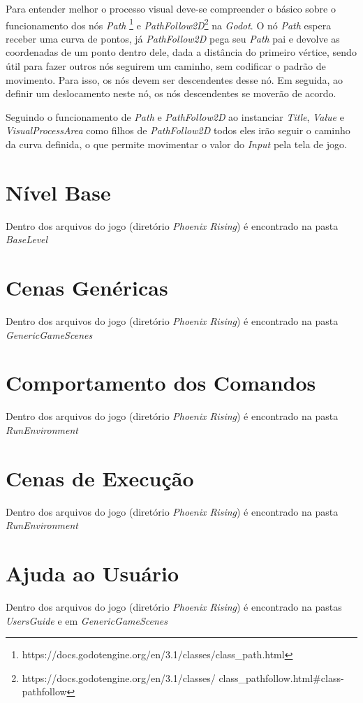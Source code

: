 Para entender melhor o processo visual deve-se compreender o básico sobre o
funcionamento dos nós \textit{Path}
\footnote{https://docs.godotengine.org/en/3.1/classes/class\_path.html} e 
\textit{PathFollow2D}\footnote{https://docs.godotengine.org/en/3.1/classes/
class\_pathfollow.html\#class-pathfollow} na \textit{Godot}.
O nó \textit{Path} espera receber uma curva de pontos, já \textit{PathFollow2D}
pega seu \textit{Path}  pai e devolve as coordenadas de um ponto dentro dele, 
dada a distância do primeiro vértice, sendo útil para fazer outros nós seguirem 
um caminho, sem codificar o padrão de movimento. Para isso, os nós devem ser 
descendentes desse nó. Em seguida, ao  definir um deslocamento neste nó, os nós 
descendentes se moverão de acordo.

Seguindo o funcionamento de \textit{Path} e \textit{PathFollow2D} ao instanciar
\textit{Title}, \textit{Value} e \textit{VisualProcessArea} como filhos de
\textit{PathFollow2D} todos eles irão seguir o caminho da curva definida, o que
permite movimentar o valor do \textit{Input} pela tela de jogo.





\section{Nível Base}

Dentro dos arquivos do jogo (diretório \textit{Phoenix Rising}) é encontrado na
pasta \textit{BaseLevel}

\section{Cenas Genéricas}

Dentro dos arquivos do jogo (diretório \textit{Phoenix Rising}) é encontrado na
pasta \textit{GenericGameScenes}

\section{Comportamento dos Comandos}

Dentro dos arquivos do jogo (diretório \textit{Phoenix Rising}) é encontrado na
pasta \textit{RunEnvironment}

\section{Cenas de Execução}

Dentro dos arquivos do jogo (diretório \textit{Phoenix Rising}) é encontrado na
pasta \textit{RunEnvironment}

\section{Ajuda ao Usuário}

Dentro dos arquivos do jogo (diretório \textit{Phoenix Rising}) é encontrado na
pastas \textit{UsersGuide} e em \textit{GenericGameScenes} 



